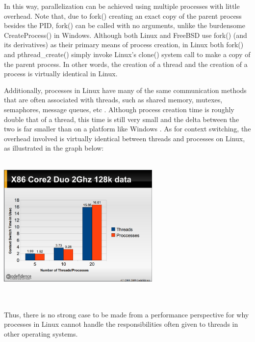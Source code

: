 \documentclass[onecolumn, draftclsnofoot,10pt, compsoc]{IEEEtran}
\begin{document}
In this way, parallelization can be achieved using multiple processes with little overhead. Note that, due to fork() creating an exact copy of the parent process besides the PID, fork() can be called with no arguments, unlike the burdensome CreateProcess() in Windows. Although both Linux and FreeBSD use fork() (and its derivatives) as their primary means of process creation, in Linux both fork() and pthread\_create() simply invoke Linux's clone() system call to make a copy of the parent process. In other words, the creation of a thread and the creation of a process is virtually identical in Linux.

Additionally, processes in Linux have many of the same communication methods that are often associated with threads, such as shared memory, mutexes, semaphores, message queues, etc \cite{LinuxSlides}. Although process creation time is roughly double that of a thread, this time is still very small and the delta between the two is far smaller than on a platform like Windows \cite{LinuxSlides}. As for context switching, the overhead involved is virtually identical between threads and processes on Linux, as illustrated in the graph below:\\ \\
\begin{minipage}{\linewidth}
\begin{center}
\includegraphics[width=0.6\textwidth]{context_switch_overhead.eps}
\end{center}
\end{minipage}
\\ \\Thus, there is no strong case to be made from a performance perspective for why processes in Linux cannot handle the responsibilities often given to threads in other operating systems.
\end{document}
